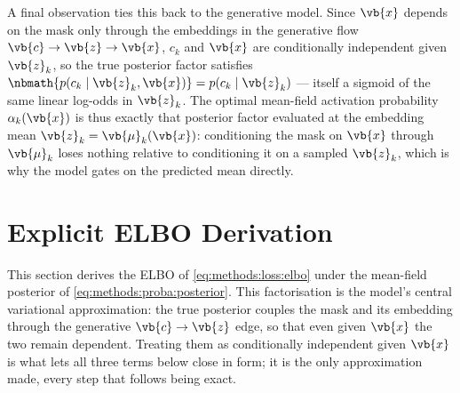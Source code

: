 A final observation ties this back to the generative model. Since $\vb{x}$
depends on the mask only through the embeddings in the generative flow $\vb{c}
\to \vb{z} \to \vb{x}$, $c_k$ and $\vb{x}$ are conditionally independent given
$\vb{z}_k$, so the true posterior factor satisfies $\nbmath{p(c_k \mid \vb{z}_k,
\vb{x})} = p(c_k \mid \vb{z}_k)$ --- itself a sigmoid of the same linear
log-odds in $\vb{z}_k$. The optimal mean-field activation probability $\alpha_k(\vb{x})$ is thus
exactly that posterior factor evaluated at the embedding mean $\vb{z}_k =
\vb{\mu}_k(\vb{x})$: conditioning the mask on $\vb{x}$ through $\vb{\mu}_k$
loses nothing relative to conditioning it on a sampled $\vb{z}_k$, which is why
the model gates on the predicted mean directly.

\section{Explicit ELBO Derivation} \label{app:vaee:elbo}

This section derives the \ac{ELBO} of \cref{eq:methods:loss:elbo}
under the mean-field posterior of
\cref{eq:methods:proba:posterior}. This factorisation is the
model's central variational approximation: the true posterior couples the mask
and its embedding through the generative $\vb{c} \to \vb{z}$ edge, so that even
given $\vb{x}$ the two remain dependent. Treating them as conditionally
independent given $\vb{x}$ is what lets all three terms below close in form; it
is the only approximation made, every step that follows being exact.

